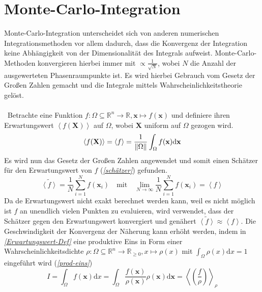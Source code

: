 \section{Monte-Carlo-Integration}
Monte-Carlo-Integration unterscheidet sich von anderen numerischen Integrationsmethoden vor allem dadurch, dass die Konvergenz der Integration keine Abhängigkeit von der Dimensionalität des Integrals aufweist. Monte-Carlo-Methoden konvergieren hierbei immer mit $\propto \frac{1}{\sqrt{N}} $, wobei $N$ die Anzahl der ausgewerteten Phasenraumpunkte ist. Es wird hierbei Gebrauch vom Gesetz der Großen Zahlen gemacht und die Integrale mittels Wahrscheinlichkeitstheorie gelöst. \\
\\\
Betrachte eine Funktion $f: \Omega \subseteq \mathbb{R}^n \rightarrow \mathbb{R}, \mathbf{x} \mapsto f(\mathbf{x})$ und definiere ihren Erwartungswert $\left\langle f(\mathbf{X})\right\rangle $ auf $\Omega$, wobei $\mathbf{X}$ uniform auf $\Omega$ gezogen wird.
\begin{equation}
\left\langle f(\mathbf{X})\right\rangle  = \left\langle f\right\rangle  = \frac{1}{\norm{\Omega}}\int_{\Omega} f(\mathbf{x}) \text{d}\mathbf{x}
\label{Erwartungswert-Def} 
\end{equation}
Es wird nun das Gesetz der Großen Zahlen angewendet und somit einen Schätzer für den Erwartungswert von $f$ (\textit{\autoref{schätzer}}) gefunden.
\begin{equation}
\tilde{\left\langle f \right\rangle } = \frac{1}{N} \sum_{i=1}^{N} f(\mathbf{x}_i) \quad \text{mit} \quad \lim_{N\rightarrow \infty} \frac{1}{N} \sum_{i=1}^{N} f(\mathbf{x}_i) = \left\langle f \right\rangle
\label{schätzer}
\end{equation}
Da de Erwartungswert nicht exakt berechnet werden kann, weil es nicht möglich ist $f$ an unendlich vielen Punkten zu evaluieren, wird verwendet, dass der Schätzer gegen den Erwartungswert konvergiert und genähert $\tilde{\left\langle f \right\rangle } \approx \left\langle f \right\rangle$. Die Geschwindigkeit der Konvergenz der Näherung kann erhöht werden, indem in \textit{\autoref{Erwartungswert-Def}} eine produktive Eins in Form einer Wahrscheinlichkeitsdichte $\rho: \Omega \subseteq \mathbb{R}^n \to \mathbb{R}_{\geq 0}, x \mapsto \rho(x)$ mit $\int_{\Omega} \rho(x) \text{d}x = 1$ eingeführt wird (\textit{\autoref{prod-eins}})
\begin{equation}
I = \int_{\Omega} f(\mathbf{x}) \text{d}x =  \int_{\Omega} \frac{f(\mathbf{x})}{\rho(\mathbf{x})}\rho(\mathbf{x}) \text{d}\mathbf{x} = \left\langle \left(\frac{f}{\rho}\right) \right\rangle_{\rho}
\label{prod-eins} 
\end{equation}
